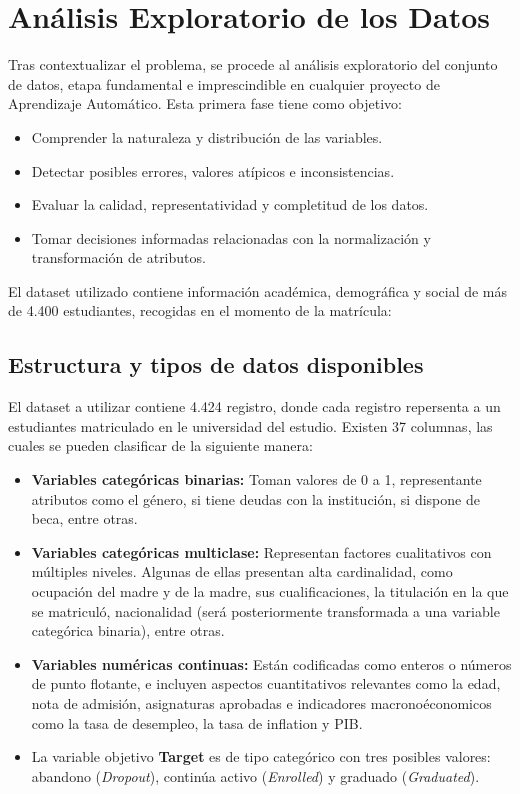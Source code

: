 \documentclass{report}[14pt]
\begin{document}
\chapter{Análisis Exploratorio de los Datos}
Tras contextualizar el problema, se procede al análisis exploratorio del conjunto de datos, etapa fundamental e imprescindible en cualquier proyecto de Aprendizaje Automático. Esta primera fase tiene como objetivo:
\begin{itemize}
    \item Comprender la naturaleza y distribución de las variables.
    \item Detectar posibles errores, valores atípicos e inconsistencias.
    \item  Evaluar la calidad, representatividad y completitud de los datos.
    \item Tomar decisiones informadas relacionadas con la normalización y transformación de atributos.
\end{itemize}
El dataset utilizado contiene información académica, demográfica y social de más de 4.400 estudiantes, recogidas en el momento de la matrícula:
\section{Estructura y tipos de datos disponibles}
El dataset a utilizar contiene 4.424 registro, donde cada registro repersenta a un estudiantes matriculado en le universidad del estudio. Existen 37 columnas, las cuales se pueden clasificar de la siguiente manera:
\begin{itemize}
    \item \textbf{Variables categóricas binarias:} Toman valores de 0 a 1, representante atributos como el género, si tiene deudas con la institución, si dispone de beca, entre otras.
    \item \textbf{Variables categóricas multiclase:} Representan factores cualitativos con múltiples niveles. Algunas de ellas presentan alta cardinalidad, como ocupación del madre y de la madre, sus cualificaciones, la titulación en la que se matriculó, nacionalidad (será posteriormente transformada a una variable categórica binaria), entre otras.
    \item \textbf{Variables numéricas continuas:} Están codificadas como enteros o números de punto flotante, e incluyen aspectos cuantitativos relevantes como la edad, nota de admisión, asignaturas aprobadas e indicadores macronoéconomicos como la tasa de desempleo, la tasa de inflation y PIB.
    \item La variable objetivo \textbf{Target} es de tipo categórico con tres posibles valores: abandono (\textit{Dropout}), continúa activo (\textit{Enrolled}) y graduado (\textit{Graduated}).

\end{itemize}
\end{document}
